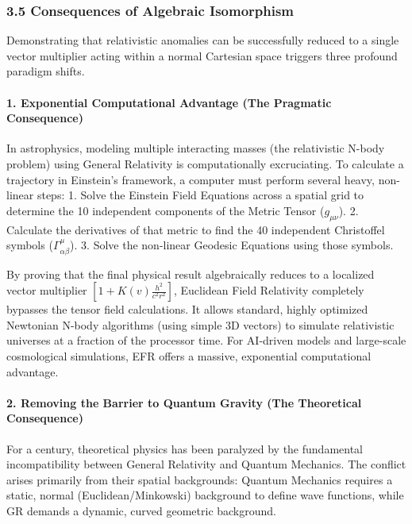 \documentclass[twocolumn]{article}
\begin{document}
\subsubsection{3.5 Consequences of Algebraic
Isomorphism}\label{consequences-of-algebraic-isomorphism}

Demonstrating that relativistic anomalies can be successfully reduced to
a single vector multiplier acting within a normal Cartesian space
triggers three profound paradigm shifts.

\paragraph{1. Exponential Computational Advantage (The Pragmatic
Consequence)}\label{exponential-computational-advantage-the-pragmatic-consequence}

In astrophysics, modeling multiple interacting masses (the relativistic
N-body problem) using General Relativity is computationally
excruciating. To calculate a trajectory in Einstein's framework, a
computer must perform several heavy, non-linear steps: 1. Solve the
Einstein Field Equations across a spatial grid to determine the 10
independent components of the Metric Tensor (\(g_{\mu\nu}\)). 2.
Calculate the derivatives of that metric to find the 40 independent
Christoffel symbols (\(\Gamma^{\mu}_{\alpha\beta}\)). 3. Solve the
non-linear Geodesic Equations using those symbols.

By proving that the final physical result algebraically reduces to a
localized vector multiplier
\(\left[ 1 + K(v) \frac{h^2}{c^2 r^2} \right]\), Euclidean Field
Relativity completely bypasses the tensor field calculations. It allows
standard, highly optimized Newtonian N-body algorithms (using simple 3D
vectors) to simulate relativistic universes at a fraction of the
processor time. For AI-driven models and large-scale cosmological
simulations, EFR offers a massive, exponential computational advantage.

\paragraph{2. Removing the Barrier to Quantum Gravity (The Theoretical
Consequence)}\label{removing-the-barrier-to-quantum-gravity-the-theoretical-consequence}

For a century, theoretical physics has been paralyzed by the fundamental
incompatibility between General Relativity and Quantum Mechanics. The
conflict arises primarily from their spatial backgrounds: Quantum
Mechanics requires a static, normal (Euclidean/Minkowski) background to
define wave functions, while GR demands a dynamic, curved geometric
background.
\end{document}
